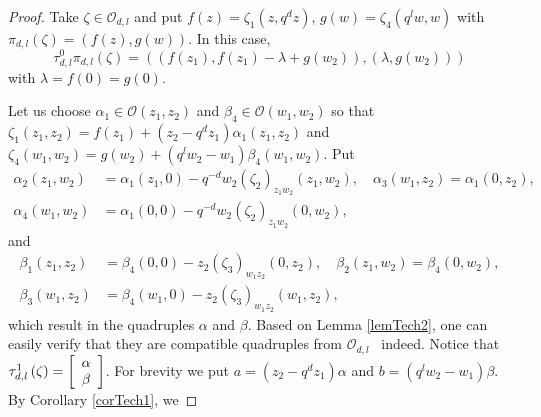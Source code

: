 \documentclass[12pt,reqno]{amsart}%
\theoremstyle{plain}
\numberwithin{theorem}{section} \numberwithin{equation}{section}
\numberwithin{lemma}{section}
\numberwithin{remark}{section}
\numberwithin{example}{section}
\numberwithin{proposition}{section}
\numberwithin{definition}{section}
\numberwithin{corollary}{section}
\begin{document}
\begin{proof}
Take $\zeta\in\mathcal{O}_{d,l}$ and put $f\left(  z\right)  =\zeta_{1}\left(
z,q^{d}z\right)  $, $g\left(  w\right)  =\zeta_{4}\left(  q^{l}w,w\right)  $
with $\pi_{d,l}\left(  \zeta\right)  =\left(  f\left(  z\right)  ,g\left(
w\right)  \right)  $. In this case,
\[
\tau_{d,l}^{0}\pi_{d,l}\left(  \zeta\right)  =\left(  \left(  f\left(
z_{1}\right)  ,f\left(  z_{1}\right)  -\lambda+g\left(  w_{2}\right)  \right)
,\left(  \lambda,g\left(  w_{2}\right)  \right)  \right)
\]
with $\lambda=f\left(  0\right)  =g\left(  0\right)  $.

Let us choose $\alpha_{1}\in\mathcal{O}\left(  z_{1},z_{2}\right)  $ and
$\beta_{4}\in\mathcal{O}\left(  w_{1},w_{2}\right)  $ so that $\zeta
_{1}\left(  z_{1},z_{2}\right)  =f\left(  z_{1}\right)  +\left(  z_{2}%
-q^{d}z_{1}\right)  \alpha_{1}\left(  z_{1},z_{2}\right)  $ and $\zeta
_{4}\left(  w_{1},w_{2}\right)  =g\left(  w_{2}\right)  +\left(  q^{l}%
w_{2}-w_{1}\right)  \beta_{4}\left(  w_{1},w_{2}\right)  $. Put
\begin{align*}
\alpha_{2}\left(  z_{1},w_{2}\right)   &  =\alpha_{1}\left(  z_{1},0\right)
-q^{-d}w_{2}\left(  \zeta_{2}\right)  _{z_{1}w_{2}}\left(  z_{1},w_{2}\right)
,\quad\alpha_{3}\left(  w_{1},z_{2}\right)  =\alpha_{1}\left(  0,z_{2}\right)
,\\
\alpha_{4}\left(  w_{1},w_{2}\right)   &  =\alpha_{1}\left(  0,0\right)
-q^{-d}w_{2}\left(  \zeta_{2}\right)  _{z_{1}w_{2}}\left(  0,w_{2}\right)  ,
\end{align*}
and%
\begin{align*}
\beta_{1}\left(  z_{1},z_{2}\right)   &  =\beta_{4}\left(  0,0\right)
-z_{2}\left(  \zeta_{3}\right)  _{w_{1}z_{2}}\left(  0,z_{2}\right)
,\quad\beta_{2}\left(  z_{1},w_{2}\right)  =\beta_{4}\left(  0,w_{2}\right)
,\\
\beta_{3}\left(  w_{1},z_{2}\right)   &  =\beta_{4}\left(  w_{1},0\right)
-z_{2}\left(  \zeta_{3}\right)  _{w_{1}z_{2}}\left(  w_{1},z_{2}\right)  ,
\end{align*}
which result in the quadruples $\alpha$ and $\beta$. Based on Lemma
\ref{lemTech2}, one can easily verify that they are compatible quadruples from
$\mathcal{O}_{d,l}$ \ indeed. Notice that $\tau_{d,l}^{1}\left(  \zeta\right)
=\left[
\begin{array}
[c]{c}%
\alpha\\
\beta
\end{array}
\right]  $. For brevity we put $a=\left(  z_{2}-q^{d}z_{1}\right)  \alpha$ and
$b=\left(  q^{l}w_{2}-w_{1}\right)  \beta$. By Corollary \ref{corTech1}, we

\end{proof}
\end{document}
